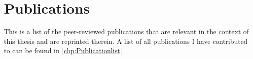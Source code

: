 \noindent
 
\chapter*{Publications}

This is a list of the peer-reviewed publications that are relevant in the context of this thesis and are reprinted therein. A list of all publications I have contributed to can be found in \autoref{chp:Publicationlist}.\\


\\

\\

\\

\\

\\


